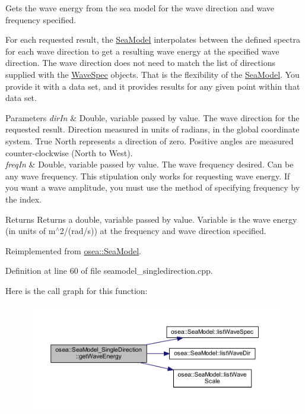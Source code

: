 Gets the wave energy from the sea model for the wave direction and wave frequency specified. 

For each requested result, the \hyperlink{classosea_1_1_sea_model}{Sea\-Model} interpolates between the defined spectra for each wave direction to get a resulting wave energy at the specified wave direction. The wave direction does not need to match the list of directions supplied with the \hyperlink{classosea_1_1_wave_spec}{Wave\-Spec} objects. That is the flexibility of the \hyperlink{classosea_1_1_sea_model}{Sea\-Model}. You provide it with a data set, and it provides results for any given point within that data set. 
\begin{DoxyParams}{Parameters}
{\em dir\-In} & Double, variable passed by value. The wave direction for the requested result. Direction measured in units of radians, in the global coordinate system. True North represents a direction of zero. Positive angles are measured counter-\/clockwise (North to West). \\
\hline
{\em freq\-In} & Double, variable passed by value. The wave frequency desired. Can be any wave frequency. This stipulation only works for requesting wave energy. If you want a wave amplitude, you must use the method of specifying frequency by the index. \\
\hline
\end{DoxyParams}
\begin{DoxyReturn}{Returns}
Returns a double, variable passed by value. Variable is the wave energy (in units of m$^\wedge$2/(rad/s)) at the frequency and wave direction specified. 
\end{DoxyReturn}


Reimplemented from \hyperlink{classosea_1_1_sea_model_abd444caa08206c2f3b2002e614f0b2fc}{osea\-::\-Sea\-Model}.



Definition at line 60 of file seamodel\-\_\-singledirection.\-cpp.



Here is the call graph for this function\-:
\nopagebreak
\begin{figure}[H]
\begin{center}
\leavevmode
\includegraphics[width=350pt]{classosea_1_1_sea_model___single_direction_ad3fd0108026c7faf7dd341e44744766c_cgraph}
\end{center}
\end{figure}




